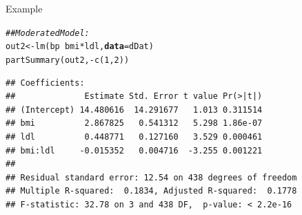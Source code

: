 \documentclass{beamer}\usepackage[]{graphicx}\usepackage[]{color}
\makeatletter
\newcommand{\hlnum}[1]{\textcolor[rgb]{0.69,0.494,0}{#1}}%
\newcommand{\hlcom}[1]{\textcolor[rgb]{0.514,0.506,0.514}{\textit{#1}}}%
\newcommand{\hlopt}[1]{\textcolor[rgb]{0,0,0}{#1}}%
\newcommand{\hlstd}[1]{\textcolor[rgb]{0,0,0}{#1}}%
\newcommand{\hlkwb}[1]{\textcolor[rgb]{0,0.341,0.682}{#1}}%
\newcommand{\hlkwc}[1]{\textcolor[rgb]{0,0,0}{\textbf{#1}}}%
\newcommand{\hlkwd}[1]{\textcolor[rgb]{0.004,0.004,0.506}{#1}}%
\newenvironment{kframe}{%
 \def\at@end@of@kframe{}%
 \ifinner\ifhmode%
  \def\at@end@of@kframe{\end{minipage}}%
  \begin{minipage}{\columnwidth}%
 \fi\fi%
 \def\FrameCommand##1{\hskip\@totalleftmargin \hskip-\fboxsep
 \colorbox{shadecolor}{##1}\hskip-\fboxsep
     \hskip-\linewidth \hskip-\@totalleftmargin \hskip\columnwidth}%
 \MakeFramed {\advance\hsize-\width
   \@totalleftmargin\z@ \linewidth\hsize
   \@setminipage}}%
 {\par\unskip\endMakeFramed%
 \at@end@of@kframe}
\newenvironment{knitrout}{}{} %
\makeatother
\begin{document}

\begin{frame}[fragile]{Example}

\begin{knitrout}\footnotesize
{}\color{fgcolor}\begin{kframe}
\begin{alltt}
\hlcom{## Moderated Model:}
\hlstd{out2} \hlkwb{<-} \hlkwd{lm}\hlstd{(bp} \hlopt{~} \hlstd{bmi} \hlopt{*} \hlstd{ldl,} \hlkwc{data} \hlstd{= dDat)}
\hlkwd{partSummary}\hlstd{(out2,} \hlopt{-}\hlkwd{c}\hlstd{(}\hlnum{1}\hlstd{,} \hlnum{2}\hlstd{))}
\end{alltt}
\begin{verbatim}
## Coefficients:
##              Estimate Std. Error t value Pr(>|t|)
## (Intercept) 14.480616  14.291677   1.013 0.311514
## bmi          2.867825   0.541312   5.298 1.86e-07
## ldl          0.448771   0.127160   3.529 0.000461
## bmi:ldl     -0.015352   0.004716  -3.255 0.001221
## 
## Residual standard error: 12.54 on 438 degrees of freedom
## Multiple R-squared:  0.1834,	Adjusted R-squared:  0.1778 
## F-statistic: 32.78 on 3 and 438 DF,  p-value: < 2.2e-16
\end{verbatim}
\end{kframe}
\end{knitrout}

\end{frame}

\end{document}
